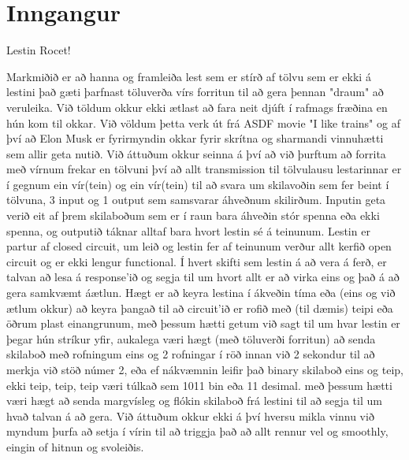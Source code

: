 \section{Inngangur}
Lestin Rocet!

Markmiðið er að hanna og framleiða lest sem er stírð af tölvu sem er ekki á lestini
það gæti þarfnast töluverða vírs forritun til að gera þennan "draum" að veruleika.
Við töldum okkur ekki ætlast að fara neit djúft í rafmags fræðina en hún kom til okkar.
Við völdum þetta verk út frá ASDF movie "I like trains" og af því að Elon Musk er 
fyrirmyndin okkar fyrir skrítna og sharmandi vinnuhætti sem allir geta nutið.
Við áttuðum okkur seinna á því að við þurftum að forrita með vírnum frekar en tölvuni
því að allt transmission til tölvulausu lestarinnar er í gegnum ein vír(tein) og 
ein vír(tein) til að svara um skilavoðin sem fer beint í tölvuna,
3 input og 1 output sem samsvarar áhveðnum skilirðum.
Inputin geta verið eit af þrem skilaboðum sem er í raun bara áhveðin stór spenna
eða ekki spenna, og outputið táknar alltaf bara hvort lestin sé á teinunum.
Lestin er partur af closed circuit, um leið og lestin fer af teinunum verður 
allt kerfið open circuit og er ekki lengur functional.
Í hvert skifti sem lestin á að vera á ferð, er talvan að lesa á response'ið og 
segja til um hvort allt er að virka eins og það á að gera samkvæmt áætlun.
Hægt er að keyra lestina í ákveðin tíma eða (eins og við ætlum okkur) að keyra 
þangað til að circuit'ið er rofið með (til dæmis) teipi eða öðrum plast einangrunum,
með þessum hætti getum við sagt til um hvar lestin er þegar hún stríkur yfir, 
aukalega væri hægt (með töluverði forritun) að senda skilaboð með rofningum
eins og 2 rofningar í röð innan við 2 sekondur  til að merkja við stöð númer 2,
eða ef nákvæmnin leifir það binary skilaboð eins og teip, ekki teip, teip, teip
væri túlkað sem 1011 bin eða 11 desimal. með þessum hætti væri hægt að senda margvísleg
og flókin skilaboð frá lestini til að segja til um hvað talvan á að gera.
Við áttuðum okkur ekki á því hversu mikla vinnu við myndum þurfa að setja í vírin til
að triggja það að allt rennur vel og smoothly, eingin of hitnun og svoleiðis.
